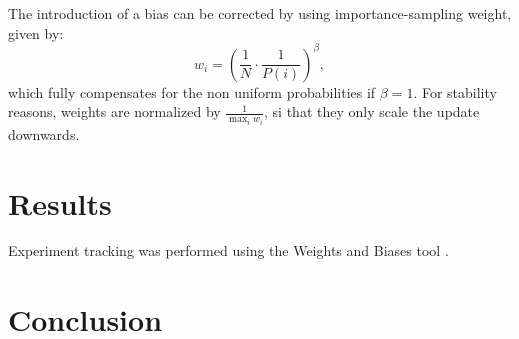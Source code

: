 \documentclass[a4paper, 12pt]{article}
\numberwithin{equation}{section}
\begin{document}
The introduction of a bias can be corrected by using importance-sampling weight, given by:
\begin{equation}
	w_i=\left(\frac{1}{N}\cdot\frac{1}{P\left(i\right)}\right)^\beta,
\end{equation}
which fully compensates for the non uniform probabilities if $\beta=1$. For stability reasons, weights are normalized by $\frac{1}{\max_iw_i}$, si that they only scale the update downwards.



\section{Results}

Experiment tracking was performed using the Weights and Biases tool \cite{wandb}.


\section{Conclusion}




















\clearpage
\printbibliography[heading=bibintoc]
\end{document}
